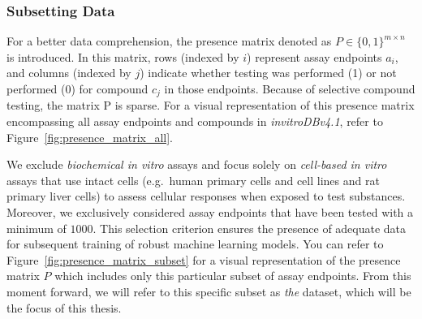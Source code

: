 \subsubsection{Subsetting Data}
For a better data comprehension, the presence matrix denoted as $P \in {\{0, 1\}}^{m \times n}$ is introduced. In this matrix, rows (indexed by $i$) represent assay endpoints $a_i$, and columns (indexed by $j$) indicate whether testing was performed (1) or not performed (0) for compound $c_j$ in those endpoints. Because of selective compound testing, the matrix P is sparse. For a visual representation of this presence matrix encompassing all assay endpoints and compounds in \textit{invitroDBv4.1}, refer to Figure~\ref{fig:presence_matrix_all}.

We exclude \emph{biochemical in vitro} assays and focus solely on \emph{cell-based in vitro} assays that use intact cells (e.g.\ human primary cells and cell lines and rat primary liver cells) to assess cellular responses when exposed to test substances. Moreover, we exclusively considered assay endpoints that have been tested with a minimum of $\num{1000}$. This selection criterion ensures the presence of adequate data for subsequent training of robust machine learning models. You can refer to Figure~\ref{fig:presence_matrix_subset} for a visual representation of the presence matrix $P$ which includes only this particular subset of assay endpoints. From this moment forward, we will refer to this specific subset as \emph{the} dataset, which will be the focus of this thesis. 

